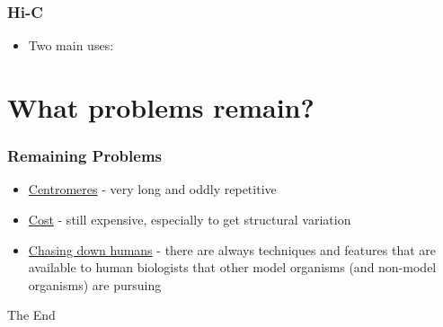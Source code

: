 \documentclass[14pt,handout]{beamer}
\begin{document}
\begin{frame}
\frametitle{Hi-C}
\begin{itemize}
	\item<+-> Two main uses:
\end{itemize}
\end{frame}


%

\section{What problems remain?}

\begin{frame}
\frametitle{Remaining Problems}
\begin{itemize}
	\item<+-> \underline{Centromeres} - very long and oddly repetitive
	\item<+-> \underline{Cost} - still expensive, especially to get structural variation
	\item<+-> \underline{Chasing down humans} - there are always techniques and features that are available to human biologists that other model organisms (and non-model organisms) are pursuing
\end{itemize}
\end{frame}



\begin{frame}
\Huge{\centerline{The End}}
\end{frame}

\end{document}
